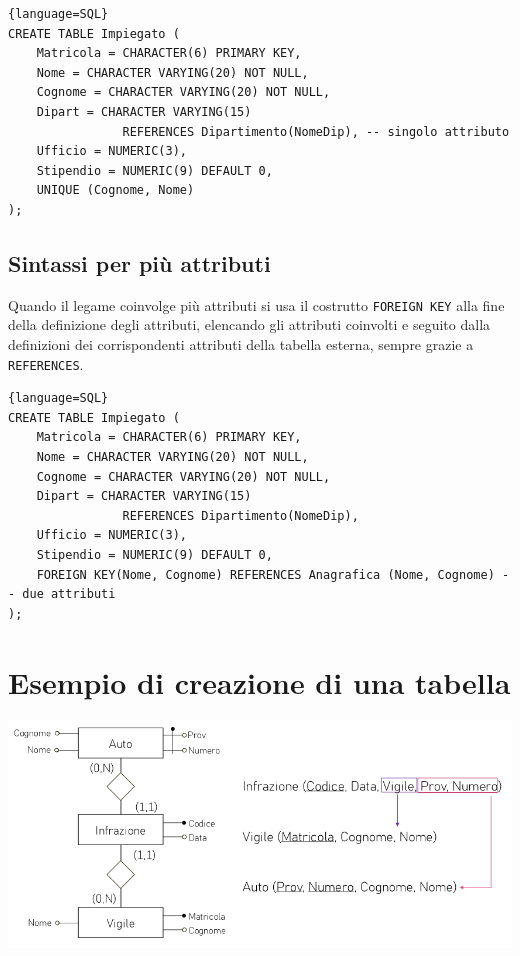 \documentclass[11pt]{report}
\begin{document}
\begin{lstlisting}{language=SQL}
CREATE TABLE Impiegato (
	Matricola = CHARACTER(6) PRIMARY KEY, 
	Nome = CHARACTER VARYING(20) NOT NULL, 
	Cognome = CHARACTER VARYING(20) NOT NULL, 
	Dipart = CHARACTER VARYING(15) 
				REFERENCES Dipartimento(NomeDip), -- singolo attributo
	Ufficio = NUMERIC(3),
	Stipendio = NUMERIC(9) DEFAULT 0, 
	UNIQUE (Cognome, Nome)
);
\end{lstlisting}

\subsection{Sintassi per pi\`u attributi}

Quando il legame coinvolge pi\`u attributi si usa il costrutto \texttt{FOREIGN KEY} alla fine della definizione degli attributi, elencando gli attributi coinvolti e seguito dalla definizioni dei corrispondenti attributi della tabella esterna, sempre grazie a \texttt{REFERENCES}.
\newpage
\begin{lstlisting}{language=SQL}
CREATE TABLE Impiegato (
	Matricola = CHARACTER(6) PRIMARY KEY, 
	Nome = CHARACTER VARYING(20) NOT NULL, 
	Cognome = CHARACTER VARYING(20) NOT NULL, 
	Dipart = CHARACTER VARYING(15) 
				REFERENCES Dipartimento(NomeDip),
	Ufficio = NUMERIC(3),
	Stipendio = NUMERIC(9) DEFAULT 0, 
	FOREIGN KEY(Nome, Cognome) REFERENCES Anagrafica (Nome, Cognome) -- due attributi
);
\end{lstlisting}

\section{Esempio di creazione di una tabella}

\begin{center}
\includegraphics[scale=0.5]{example-create}
\end{center}
\end{document}
